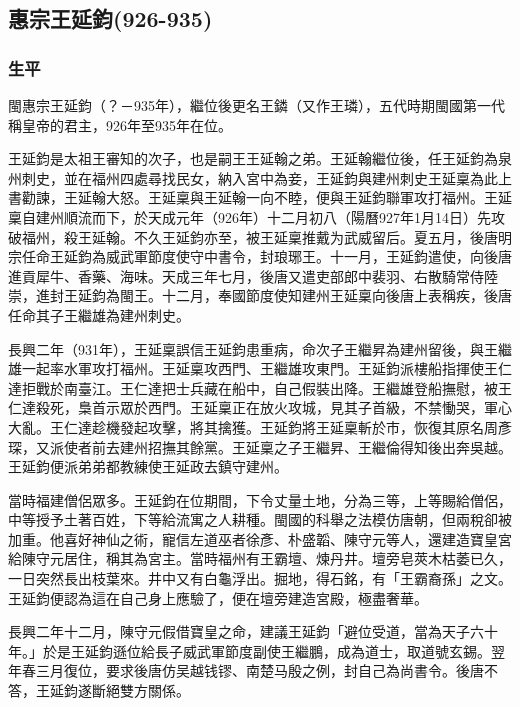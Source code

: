 
\subsection{惠宗王延鈞\tiny(926-935)}

\subsubsection{生平}

閩惠宗王延鈞（？－935年），繼位後更名王鏻（又作王璘），五代時期閩國第一代稱皇帝的君主，926年至935年在位。

王延鈞是太祖王審知的次子，也是嗣王王延翰之弟。王延翰繼位後，任王延鈞為泉州刺史，並在福州四處尋找民女，納入宮中為妾，王延鈞與建州刺史王延稟為此上書勸諫，王延翰大怒。王延稟與王延翰一向不睦，便與王延鈞聯軍攻打福州。王延稟自建州順流而下，於天成元年（926年）十二月初八（陽曆927年1月14日）先攻破福州，殺王延翰。不久王延鈞亦至，被王延稟推戴为武威留后。夏五月，後唐明宗任命王延鈞為威武軍節度使守中書令，封琅琊王。十一月，王延鈞遣使，向後唐進貢犀牛、香藥、海味。天成三年七月，後唐又遣吏部郎中裴羽、右散騎常侍陸崇，進封王延鈞為閩王。十二月，奉國節度使知建州王延稟向後唐上表稱疾，後唐任命其子王繼雄為建州刺史。

長興二年（931年），王延稟誤信王延鈞患重病，命次子王繼昇為建州留後，與王繼雄一起率水軍攻打福州。王延稟攻西門、王繼雄攻東門。王延鈞派樓船指揮使王仁達拒戰於南臺江。王仁達把士兵藏在船中，自己假裝出降。王繼雄登船撫慰，被王仁達殺死，梟首示眾於西門。王延稟正在放火攻城，見其子首級，不禁慟哭，軍心大亂。王仁達趁機發起攻擊，將其擒獲。王延鈞將王延稟斬於市，恢復其原名周彥琛，又派使者前去建州招撫其餘黨。王延稟之子王繼昇、王繼倫得知後出奔吳越。王延鈞便派弟弟都教練使王延政去鎮守建州。

當時福建僧侶眾多。王延鈞在位期間，下令丈量土地，分為三等，上等賜給僧侶，中等授予土著百姓，下等給流寓之人耕種。閩國的科舉之法模仿唐朝，但兩稅卻被加重。他喜好神仙之術，寵信左道巫者徐彥、朴盛韜、陳守元等人，還建造寶皇宮給陳守元居住，稱其為宮主。當時福州有王霸壇、煉丹井。壇旁皂莢木枯萎已久，一日突然長出枝葉來。井中又有白龜浮出。掘地，得石銘，有「王霸裔孫」之文。王延鈞便認為這在自己身上應驗了，便在壇旁建造宮殿，極盡奢華。

長興二年十二月，陳守元假借寶皇之命，建議王延鈞「避位受道，當為天子六十年。」於是王延鈞遜位給長子威武軍節度副使王繼鵬，成為道士，取道號玄錫。翌年春三月復位，要求後唐仿吴越钱镠、南楚马殷之例，封自己為尚書令。後唐不答，王延鈞遂斷絕雙方關係。

